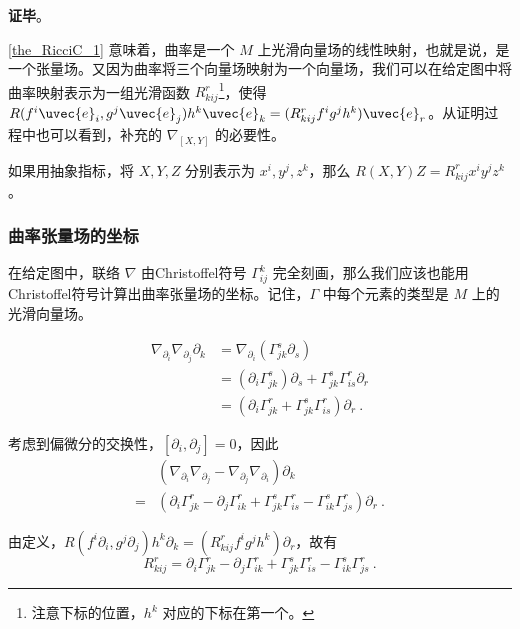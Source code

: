 \textbf{证毕}。

\autoref{the_RicciC_1} 意味着，曲率是一个 $M$ 上光滑向量场的线性映射，也就是说，是一个张量场。又因为曲率将三个向量场映射为一个向量场，我们可以在给定图中将曲率映射表示为一组光滑函数 $R^r_{kij}$\footnote{注意下标的位置，$h^k$ 对应的下标在第一个。}，使得 $R(f^i\uvec{e}_i, g^j\uvec{e}_j)h^k\uvec{e}_k=(R^r_{kij}f^ig^jh^k)\uvec{e}_r$。从证明过程中也可以看到，补充的 $\nabla_{[X, Y]}$ 的必要性。

如果用抽象指标，将 $X, Y, Z$ 分别表示为 $x^i, y^j, z^k$，那么 $R(X, Y)Z=R^r_{kij}x^iy^jz^k$。


\subsubsection{曲率张量场的坐标}

在给定图中，联络 $\nabla$ 由Christoffel符号 $\Gamma^k_{ij}$ 完全刻画，那么我们应该也能用Christoffel符号计算出曲率张量场的坐标。记住，$\Gamma$ 中每个元素的类型是 $M$ 上的光滑向量场。

\begin{equation}
\begin{aligned}
\nabla_{\partial_i}\nabla_{\partial_j}\partial_k&=\nabla_{\partial_i}(\Gamma^s_{jk}\partial_s)\\
&=(\partial_i\Gamma^s_{jk})\partial_s+\Gamma^s_{jk}\Gamma^r_{is}\partial_r\\
&=(\partial_i\Gamma^r_{jk}+\Gamma^s_{jk}\Gamma^r_{is})\partial_r~.
\end{aligned}
\end{equation}


考虑到偏微分的交换性，$[\partial_i, \partial_j]=0$，因此
\begin{equation}
\begin{aligned}
&(\nabla_{\partial_i}\nabla_{\partial_j}-\nabla_{\partial_j}\nabla_{\partial_i})\partial_k\\
={}&(\partial_i\Gamma^r_{jk}-\partial_j\Gamma^{r}_{ik}+\Gamma^s_{jk}\Gamma^r_{is}-\Gamma^s_{ik}\Gamma^r_{js})\partial_r~.
\end{aligned}
\end{equation}

由定义，$R(f^i\partial_i, g^j\partial_j)h^k\partial_k=(R^r_{kij}f^ig^jh^k)\partial_r$，故有
\begin{equation}\label{eq_RicciC_1}
R^r_{kij}=\partial_i\Gamma^r_{jk}-\partial_j\Gamma^{r}_{ik}+\Gamma^s_{jk}\Gamma^r_{is}-\Gamma^s_{ik}\Gamma^r_{js}~.
\end{equation}

